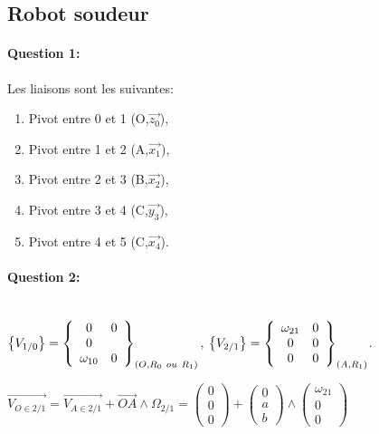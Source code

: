 \subsection{Robot soudeur}

\paragraph{Question 1:} Les liaisons sont les suivantes:
\begin{enumerate}
 \item Pivot entre 0 et 1 (O,$\overrightarrow{z_0}$),
 \item Pivot entre 1 et 2 (A,$\overrightarrow{x_1}$),
 \item Pivot entre 2 et 3 (B,$\overrightarrow{x_2}$),
 \item Pivot entre 3 et 4 (C,$\overrightarrow{y_3}$),
 \item Pivot entre 4 et 5 (C,$\overrightarrow{x_4}$).
\end{enumerate}

\paragraph{Question 2:} ~\ \\
 
$\left\{V_{1/0}\right\}=\left\{\begin{array}{c c} 0 & 0\\ 0 &  \\ \omega_{10} & 0 \end{array} \right\}_{(O,R_0\ ou\ R_1)}$,
$\left\{V_{2/1}\right\}=\left\{\begin{array}{c c} \omega_{21} & 0\\ 0 & 0 \\ 0 & 0 \end{array} \right\}_{(A,R_1)}$.

$\overrightarrow{V_{O\in2/1}}=\overrightarrow{V_{A\in2/1}}+\overrightarrow{OA}\wedge \Omega_{2/1}=\left(\begin{array}{c} 0 \\ 0 \\ 0 \end{array}\right)+\left(\begin{array}{c} 0 \\ a \\ b \end{array}\right) \wedge \left(\begin{array}{c} \omega_{21} \\ 0 \\ 0 \end{array}\right)$

